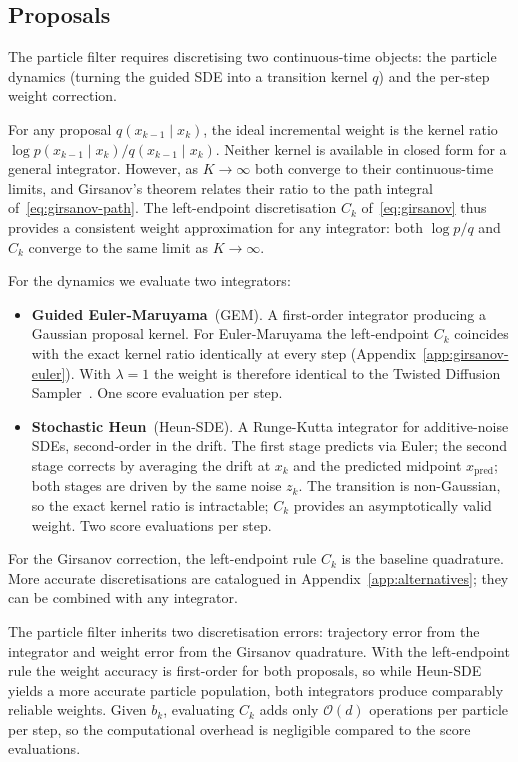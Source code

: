 \documentclass[11pt]{article}
\begin{document}
\subsection{Proposals}\label{sec:proposals}

The particle filter requires discretising two continuous-time objects:
the particle dynamics (turning the guided SDE into a transition kernel $q$)
and the per-step weight correction.

For any proposal $q(x_{k-1}\mid x_k)$, the ideal incremental weight is the
kernel ratio $\log p(x_{k-1}\mid x_k)/q(x_{k-1}\mid x_k)$.
Neither kernel is available in closed form for a general integrator.
However, as $K\to\infty$ both converge to their continuous-time limits, and
Girsanov's theorem relates their ratio to the path integral of~\eqref{eq:girsanov-path}.
The left-endpoint discretisation $C_k$ of~\eqref{eq:girsanov} thus
provides a consistent weight approximation for any integrator:
both $\log p/q$ and $C_k$ converge to the same limit as $K\to\infty$.

For the dynamics we evaluate two integrators:
\begin{itemize}
  \item \textbf{Guided Euler-Maruyama}~(GEM).  A first-order integrator
    producing a Gaussian proposal kernel.
    For Euler-Maruyama the left-endpoint $C_k$ coincides with the exact
    kernel ratio identically at every step (Appendix~\ref{app:girsanov-euler}).
    With $\lambda = 1$ the weight is therefore identical to the Twisted Diffusion
    Sampler~\citep{wu2023tds}.
    One score evaluation per step.
  \item \textbf{Stochastic Heun}~(Heun-SDE).  A Runge-Kutta integrator
    for additive-noise SDEs, second-order in the drift.
    The first stage predicts via Euler; the second stage corrects by averaging
    the drift at $x_k$ and the predicted midpoint $x_{\text{pred}}$;
    both stages are driven by the same noise $z_k$.
    The transition is non-Gaussian, so the exact kernel ratio is
    intractable; $C_k$ provides an asymptotically valid weight.
    Two score evaluations per step.
\end{itemize}

For the Girsanov correction, the left-endpoint rule $C_k$
is the baseline quadrature.
More accurate discretisations are catalogued in
Appendix~\ref{app:alternatives}; they can be combined with any integrator.

The particle filter inherits two discretisation errors: trajectory error from the
integrator and weight error from the Girsanov quadrature.
With the left-endpoint rule the weight accuracy is first-order for both proposals,
so while Heun-SDE yields a more accurate particle population, both integrators
produce comparably reliable weights.
Given $b_k$, evaluating $C_k$ adds only $\mathcal{O}(d)$ operations per particle per
step, so the computational overhead is negligible compared to the score evaluations.
\end{document}
